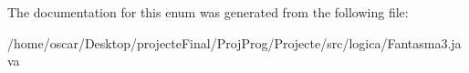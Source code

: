 The documentation for this enum was generated from the following file\+:\begin{DoxyCompactItemize}
\item 
/home/oscar/\+Desktop/projecte\+Final/\+Proj\+Prog/\+Projecte/src/logica/Fantasma3.\+java\end{DoxyCompactItemize}
